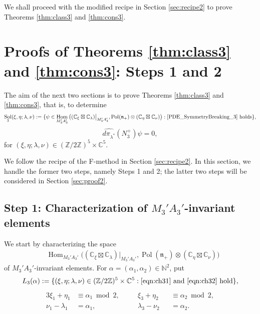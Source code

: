 \documentclass[a4paper,11pt,reqno]{amsart}
\newcommand{\frakn}{\mathfrak{n}}
\newcommand{\CC}{\mathbb{C}}
\newcommand{\ZZ}{\mathbb{Z}}
\newcommand{\0}{{\bf 0}}
\newcommand{\N}{\mathbb{N}}
\newcommand{\1}{{\bf 1}}
\DeclareMathOperator{\Hom}{Hom}
\DeclareMathOperator{\Pol}{Pol}
\DeclareMathOperator{\Sol}{Sol}
\theoremstyle{plain}
\theoremstyle{definition}
\numberwithin{equation}{section}
\theoremstyle{definition}
\begin{document}
We shall proceed with the modified recipe in Section \ref{sec:recipe2}
to prove Theorems \ref{thm:class3} and \ref{thm:cons3}.

\section{Proofs of  Theorems \texorpdfstring{\ref{thm:class3}}{6.7} and \texorpdfstring{\ref{thm:cons3}}{6.12}: Steps 1 and 2}
\label{sec:proof1}

The aim of the next two sections is to prove Theorems \ref{thm:class3} and \ref{thm:cons3},
that is, to determine 
\begin{align*}
\Sol_3(\xi,\eta; \lambda,\nu) := \{ \psi \in \Hom_{M_3'A_3'}\big((\CC_\xi\boxtimes \CC_{\lambda})\big\rvert_{M_3'A_3'},\Pol(\frakn_+)\otimes (\CC_\eta\boxtimes \CC_{\nu})\big) : \eqref{PDE_SymmetryBreaking_3} \text{ holds}\},
\end{align*}
\begin{equation}\label{PDE_SymmetryBreaking_3}
\widehat{d\pi_{\lambda^*}}(N_{3}^+)\psi = 0,
\end{equation}
for $(\xi,\eta; \lambda,\nu) \in (\ZZ/2\ZZ)^5\times \CC^5$.

We follow the recipe of the F-method in Section \ref{sec:recipe2}.
In this section, we handle the former two steps, namely Steps 1 and 2;
the latter two steps will be considered in Section \ref{sec:proof2}.


\subsection{Step 1: Characterization of \texorpdfstring{$M_3'A_3'$}{M₃'A₃'}-invariant elements}

We start by characterizing the space 
\begin{align*}
&\Hom_{M_3'A_3'}\big((\CC_\xi\boxtimes \CC_{\lambda})\big\rvert_{M_3'A_3'},\Pol(\frakn_+)\otimes (\CC_\eta\boxtimes \CC_{\nu})\big)
\end{align*}
of $M_3'A_3'$-invariant elements. 
For $\alpha=(\alpha_1,\alpha_2) \in \N^2$, put
\begin{equation*}
L_3(\alpha):=\{(\xi, \eta; \lambda, \nu) \in (\ZZ/2\ZZ)^5\times \CC^5: 
\text{\eqref{eqn:ch31} and \eqref{eqn:ch32} hold}  \},
\end{equation*}
\begin{alignat}{3}
\xi_1+\eta_1&\equiv \alpha_1 \bmod{2}, \quad &&\xi_3+\eta_2&&\equiv\alpha_2 \bmod{2},
\label{eqn:ch31}\\[3pt]
\nu_1-\lambda_1&=\alpha_1, \quad &&\lambda_3-\nu_2&&=\alpha_2.
\label{eqn:ch32}
\end{alignat}
\end{document}
